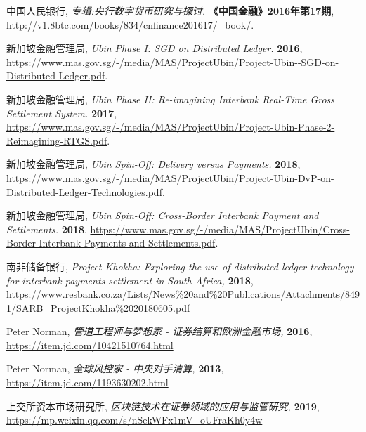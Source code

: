 \begin{thebibliography}{99}
     中国人民银行,
    \newblock \textit{专辑:央行数字货币研究与探讨. }
    \newblock \textbf{《中国金融》2016年第17期},
    \newblock \url{http://v1.8btc.com/books/834/cnfinance201617/_book/}.
    
     新加坡金融管理局,
    \newblock \textit{Ubin Phase I: SGD on Distributed Ledger.}
    \newblock \textbf{2016},
    \newblock \url{https://www.mas.gov.sg/-/media/MAS/ProjectUbin/Project-Ubin--SGD-on-Distributed-Ledger.pdf}.

     新加坡金融管理局,
    \newblock \textit{Ubin Phase II: Re-imagining Interbank Real-Time Gross Settlement System.}
    \newblock \textbf{2017},
    \newblock \url{https://www.mas.gov.sg/-/media/MAS/ProjectUbin/Project-Ubin-Phase-2-Reimagining-RTGS.pdf}.

     新加坡金融管理局,
    \newblock \textit{Ubin Spin-Off: Delivery versus Payments.}
    \newblock \textbf{2018},
    \newblock \url{https://www.mas.gov.sg/-/media/MAS/ProjectUbin/Project-Ubin-DvP-on-Distributed-Ledger-Technologies.pdf}.

     新加坡金融管理局,
    \newblock \textit{Ubin Spin-Off: Cross-Border Interbank Payment and Settlements.}
    \newblock \textbf{2018},
    \newblock \url{https://www.mas.gov.sg/-/media/MAS/ProjectUbin/Cross-Border-Interbank-Payments-and-Settlements.pdf}.

     南非储备银行,
    \newblock \textit{Project Khokha: Exploring the use of distributed ledger technology for interbank payments settlement in South Africa, }
    \newblock \textbf{2018},
    \newblock \url{https://www.resbank.co.za/Lists/News\%20and\%20Publications/Attachments/8491/SARB\_ProjectKhokha\%2020180605.pdf}

     Peter Norman,
    \newblock \textit{管道工程师与梦想家 - 证券结算和欧洲金融市场, }
    \newblock \textbf{2016},
    \newblock \url{https://item.jd.com/10421510764.html}
    
     Peter Norman,
    \newblock \textit{全球风控家 - 中央对手清算, }
    \newblock \textbf{2013},
    \newblock \url{https://item.jd.com/1193630202.html}

     上交所资本市场研究所,
    \newblock \textit{区块链技术在证券领域的应用与监管研究, }
    \newblock \textbf{2019},
    \newblock \url{https://mp.weixin.qq.com/s/nSekWFx1mV_oUFraKh0y4w}

    
\end{thebibliography}
